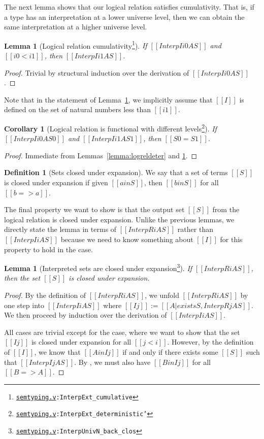 \documentclass[\ifpublic nolinenum\else\fi,online,OA]{jfp}
\newcommand{\scw}[1]{}
\newcommand{\yl}[1]{}
\newcommand{\dotv}[2]{\href{#1}{\texttt{#1}}{\texttt{:#2}}}
\newtheorem{lemma}[theorem]{Lemma}
\newtheorem{corollary}[theorem]{Corollary}
\theoremstyle{definition}
\newtheorem{definition}[theorem]{Definition}
\begin{document}
The next lemma shows that our logical relation satisfies
cumulativity. That is, if a type has an interpretation at a lower
universe level, then we can obtain the same interpretation at a higher
universe level.
\begin{lemma}[Logical relation cumulativity\footnote{\dotv{semtyping.v}{InterpExt\_cumulative}}]
  \label{lemma:logrelcumulativity}
  If $[[Interp I i0 A S]]$ and $[[i0 < i1]]$, then $[[Interp I i1 A S]]$.
\end{lemma}
\begin{proof}
  Trivial by structural induction over the derivation of $[[Interp I
  i0 A S]]$.
\end{proof}
Note that in the statement of Lemma~\ref{lemma:logrelcumulativity}, we
implicitly assume that $[[I]]$ is defined on the set of natural
numbers less than $[[i1]]$.

\begin{corollary}[Logical relation is functional with different levels\footnote{\dotv{semtyping.v}{InterpExt\_deterministic'}}]
  \label{lemma:logreldeterhet}
  If $[[Interp I i0 A S0]]$ and $[[Interp I i1 A S1]]$, then $[[S0 = S1]]$.
\end{corollary}
\begin{proof}
  Immediate from Lemmas~\ref{lemma:logreldeter} and
  \ref{lemma:logrelcumulativity}.
\end{proof}

\begin{definition}[Sets closed under expansion]
  We say that a set of terms $[[S]]$ is closed under expansion if
  given $[[a in S]]$, then $[[b in S]]$ for all $[[b => a]]$.
\end{definition}
The final property we want to show is that the output set $[[S]]$ from
the logical relation is closed under expansion. Unlike the previous
lemmas, we directly state the lemma
in terms of $[[InterpR i A S]]$ rather than $[[Interp I i A S]]$
because we need to know something about $[[I]]$ for this property to
hold in the  case.

\yl{Can lift this lemma somewhere earlier in the section since it doesn't really
  depend on anything}
\scw{Jon didn't understand this proof}
\begin{lemma}[Interpreted sets are closed under expansion\footnote{\dotv{semtyping.v}{InterpUnivN\_back\_clos}}]
  \label{lemma:logrelbackclos}
  If $[[InterpR i A S]]$, then the set $[[S]]$ is closed under expansion.
\end{lemma}
\begin{proof}
  By the definition of $[[InterpR i A S]]$, we unfold $[[InterpR i A S]]$ by one
  step into $[[ Interp I i A S  ]]$ where $[[I j]] := [[{A | exists S
    , InterpR j A S}]]$.
  We then proceed by induction over the derivation of $[[Interp I i A S]]$.

  All cases are trivial except for the  case, where we
  want to show that the set $[[I j]]$ is closed under expansion for
  all $[[j < i]]$. However, by the definition of $[[I]]$, we know that
  $[[A in I j]]$ if and only if there exists some $[[S]]$ such that
  $[[Interp I j A S]]$. By , we must also have $[[B in I
  j]]$ for all $[[B => A]]$.
\end{proof}
\end{document}
